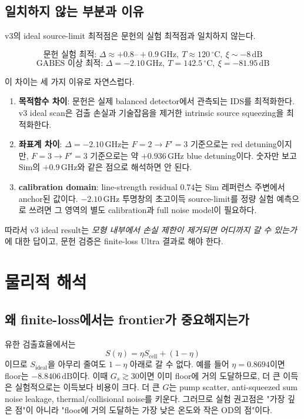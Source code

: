\documentclass[11pt,a4paper]{article}
\newcommand{\dB}{\,\mathrm{dB}}
\newcommand{\GHz}{\,\mathrm{GHz}}
\newcommand{\degC}{\,^{\circ}\mathrm{C}}
\begin{document}
\subsection{일치하지 않는 부분과 이유}
v3의 ideal source-limit 최적점은 문헌의 실험 최적점과 일치하지 않는다.

\begin{equation}
\text{문헌 실험 최적: } \Delta\approx+0.8\text{--}+0.9\GHz,\ T\approx120\degC,\ \xi\sim-8\dB
\end{equation}
\begin{equation}
\text{GABES 이상 최적: } \Delta=-2.10\GHz,\ T=142.5\degC,\ \xi=-81.95\dB
\end{equation}

이 차이는 세 가지 이유로 자연스럽다.

\begin{enumerate}[nosep]
\item \textbf{목적함수 차이}: 문헌은 실제 balanced detector에서 관측되는 IDS를 최적화한다.
      v3 ideal scan은 검출 손실과 기술잡음을 제거한 intrinsic source squeezing을 최적화한다.
\item \textbf{좌표계 차이}: $\Delta=-2.10\GHz$는 $F=2\to F'=3$ 기준으로는 red detuning이지만,
      $F=3\to F'=3$ 기준으로는 약 $+0.936\GHz$ blue detuning이다. 숫자만 보고 Sim의
      $+0.9\GHz$와 같은 점으로 해석하면 안 된다.
\item \textbf{calibration domain}: line-strength residual $0.74$는 Sim 레퍼런스 주변에서
      anchor된 값이다. $-2.10\GHz$ 투명창의 초고이득 source-limit를 정량 실험 예측으로 쓰려면
      그 영역의 별도 calibration과 full noise model이 필요하다.
\end{enumerate}

따라서 v3 ideal result는 \emph{모형 내부에서 손실 제한이 제거되면 어디까지 갈 수 있는가}에
대한 답이고, 문헌 검증은 finite-loss Ultra 결과로 해야 한다.

\section{물리적 해석}

\subsection{왜 finite-loss에서는 frontier가 중요해지는가}
유한 검출효율에서는
\begin{equation}
S(\eta)=\eta S_{\mathrm{cell}}+(1-\eta)
\end{equation}
이므로 $S_{\mathrm{ideal}}$을 아무리 줄여도 $1-\eta$ 아래로 갈 수 없다. 예를 들어
$\eta=0.8694$이면 floor는 $-8.8406\dB$이다. 이때 $G_s\gtrsim30$이면 이미 floor에
거의 도달하므로, 더 큰 이득은 실험적으로는 이득보다 비용이 크다. 더 큰 $G$는 pump scatter,
anti-squeezed sum noise leakage, thermal/collisional noise를 키운다. 그러므로 실험 권고점은
"가장 깊은 점"이 아니라 "floor에 거의 도달하는 가장 낮은 온도와 작은 OD의 점"이다.
\end{document}
